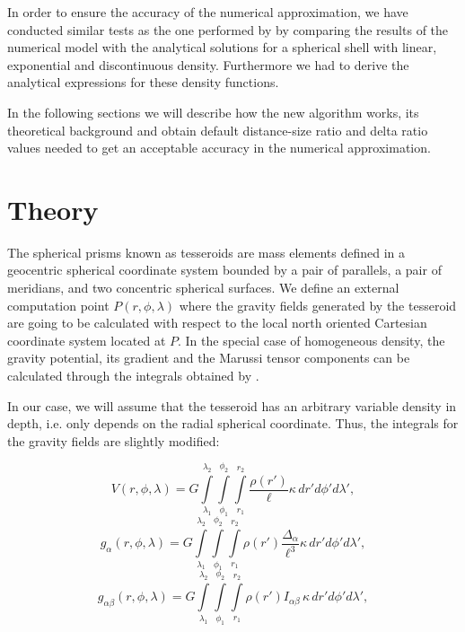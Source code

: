 \documentclass[extra]{gji}
\begin{document}
In order to ensure the accuracy of the numerical approximation, we have conducted similar tests as the one performed by \citet{Uieda2016} by comparing the results of the numerical model with the analytical solutions for a spherical shell with linear, exponential and discontinuous density.
Furthermore we had to derive the analytical expressions for these density functions.

In the following sections we will describe how the new algorithm works, its theoretical background and obtain default distance-size ratio and delta ratio values needed to get an acceptable accuracy in the numerical approximation.


\section{Theory}

The spherical prisms known as tesseroids are mass elements defined in a geocentric spherical coordinate system bounded by a pair of parallels, a pair of  meridians, and two concentric spherical surfaces.
We define an external computation point $P(r, \phi, \lambda)$ where the gravity fields generated by the tesseroid are going to be calculated with respect to the local north oriented Cartesian coordinate system located at $P$.
In the special case of homogeneous density, the gravity potential, its gradient and the Marussi tensor components can be calculated through the integrals obtained by \citet{Grombein2013} \citep[for same notation as the one we will use, see][]{Uieda2016}.

In our case, we will assume that the tesseroid has an arbitrary variable density in depth, i.e. only depends on the radial spherical coordinate.
Thus, the integrals for the gravity fields are slightly modified:

\begin{equation}
    V(r,\phi,\lambda) = G
    \int\limits_{\lambda_1}^{\lambda_2}
    \int\limits_{\phi_1}^{\phi_2}
    \int\limits_{r_1}^{r_2}
    \frac{\rho(r')}{\ell} \kappa \,  dr' d\phi' d\lambda',
\label{eq:tesseroid-pot}
\end{equation}
\begin{equation}
    g_{\alpha}(r,\phi,\lambda) = G
    \int\limits_{\lambda_1}^{\lambda_2}
    \int\limits_{\phi_1}^{\phi_2}
    \int\limits_{r_1}^{r_2}
    \rho(r') \frac{\Delta_\alpha}{\ell^3}
    \kappa \, dr' d\phi' d\lambda',
\label{eq:tesseroid-grav}
\end{equation}
\begin{equation}
    g_{\alpha\beta}(r,\phi,\lambda) = G
    \int\limits_{\lambda_1}^{\lambda_2}
    \int\limits_{\phi_1}^{\phi_2}
    \int\limits_{r_1}^{r_2}
    \rho(r') I_{\alpha\beta} \, \kappa \, dr' d\phi' d\lambda' ,
    \label{eq:tesseroid-tensor}
\end{equation}
\end{document}
